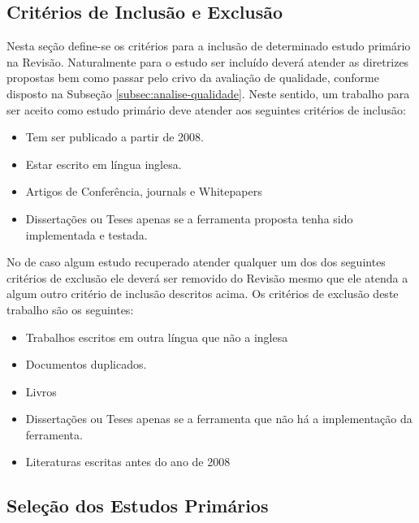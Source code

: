 \documentclass[12pt]{article}
\begin{document}
\subsection{Critérios de Inclusão e Exclusão}
\label{subsec:inclusao-exclusao}

Nesta seção define-se os critérios para a inclusão de determinado estudo
primário na Revisão. Naturalmente para o estudo ser incluído deverá atender as diretrizes propostas bem
como passar pelo crivo da avaliação de qualidade, conforme disposto na Subseção
\ref{subsec:analise-qualidade}. Neste sentido, um trabalho para ser aceito
como estudo primário deve atender aos seguintes critérios de inclusão:

\begin{itemize}

\item Tem ser publicado a partir de 2008.
\item Estar escrito em língua inglesa.
\item Artigos de Conferência, journals e Whitepapers
\item Dissertações ou Teses apenas se a ferramenta proposta tenha sido
  implementada e testada.
\end{itemize}


No de caso algum estudo recuperado atender qualquer um dos dos seguintes
critérios de exclusão ele deverá ser removido do Revisão mesmo que ele atenda a
algum outro critério de inclusão descritos acima. Os critérios de exclusão
deste trabalho são os seguintes:

\begin{itemize}
\item Trabalhos escritos em outra língua que não a inglesa
\item Documentos duplicados.
\item Livros
\item Dissertações ou Teses apenas se a ferramenta que não há a implementação da
  ferramenta.
\item Literaturas escritas antes do ano de 2008
\end{itemize}

\subsection{Seleção dos Estudos Primários}
\label{subsec:estudos-primarios}
\end{document}

